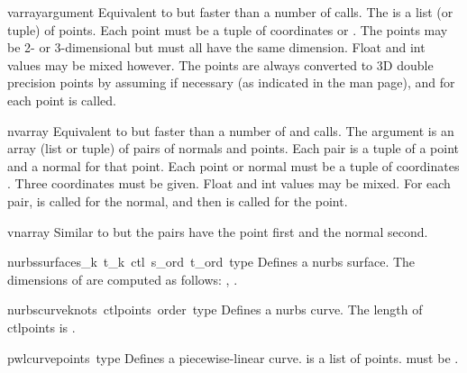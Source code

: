 \renewcommand{\indexsubitem}{(in module gl)}
\begin{funcdesc}{varray}{argument}
Equivalent to but faster than a number of
calls.
The  is a list (or tuple) of points.
Each point must be a tuple of coordinates
 or .
The points may be 2- or 3-dimensional but must all have the
same dimension.
Float and int values may be mixed however.
The points are always converted to 3D double precision points
by assuming  if necessary (as indicated in the man page),
and for each point
is called.
\end{funcdesc}

\begin{funcdesc}{nvarray}{}
Equivalent to but faster than a number of
and
calls.
The argument is an array (list or tuple) of pairs of normals and points.
Each pair is a tuple of a point and a normal for that point.
Each point or normal must be a tuple of coordinates
.
Three coordinates must be given.
Float and int values may be mixed.
For each pair,
is called for the normal, and then
is called for the point.
\end{funcdesc}

\begin{funcdesc}{vnarray}{}
Similar to 
but the pairs have the point first and the normal second.
\end{funcdesc}

\begin{funcdesc}{nurbssurface}{s_k\, t_k\, ctl\, s_ord\, t_ord\, type}
Defines a nurbs surface.
The dimensions of
are computed as follows:
,
.
\end{funcdesc}

\begin{funcdesc}{nurbscurve}{knots\, ctlpoints\, order\, type}
Defines a nurbs curve.
The length of ctlpoints is
.
\end{funcdesc}

\begin{funcdesc}{pwlcurve}{points\, type}
Defines a piecewise-linear curve.
is a list of points.
must be
.
\end{funcdesc}

